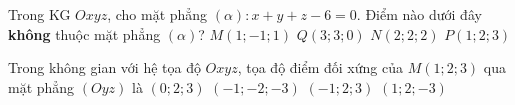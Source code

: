 \begin{ex}%
	Trong KG $Oxyz$, cho mặt phẳng $(\alpha): x+y+z-6=0$. Điểm nào dưới đây \textbf{không} thuộc mặt phẳng $(\alpha)$?
	\choice
	{\True $M(1; -1; 1)$}
	{$Q(3; 3; 0)$}
	{$N(2; 2; 2)$}
	{$P(1; 2; 3)$}
\end{ex}
\begin{ex}%
	Trong không gian với hệ tọa độ $ Oxyz $, tọa độ điểm đối xứng của $ M(1;2;3) $ qua mặt phẳng $ (Oyz) $ là 
	\choice
	{$ (0;2;3) $}
	{$ (-1;-2;-3) $}
	{\True $ (-1;2;3) $}
	{$ (1;2;-3) $}
\end{ex}

